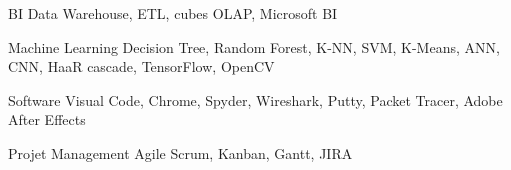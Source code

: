 \begin{cvskills}
\cvskill
    {BI} %
    {Data Warehouse, ETL, cubes OLAP, Microsoft BI } %


\cvskill
    {Machine Learning} %
    {Decision Tree, Random Forest, K-NN, SVM, K-Means, ANN, CNN, HaaR cascade, TensorFlow, OpenCV } %


\cvskill
    {Software} %
    {Visual Code, Chrome, Spyder, Wireshark, Putty, Packet Tracer, Adobe After Effects } %


\cvskill
    {Projet Management} %
    {Agile Scrum, Kanban, Gantt, JIRA } %

\end{cvskills}
